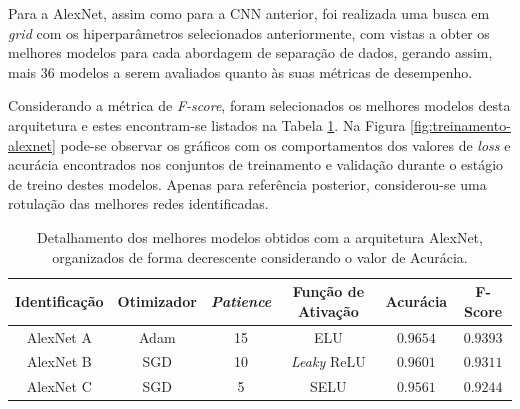 
Para a AlexNet, assim como para a CNN anterior, foi realizada uma busca em \emph{grid} com os hiperparâmetros selecionados anteriormente, com vistas a obter os melhores modelos para cada abordagem de separação de dados, gerando assim, mais $36$ modelos a serem avaliados quanto às suas métricas de desempenho.

Considerando a métrica de \emph{F-score}, foram selecionados os melhores modelos  desta arquitetura e estes encontram-se listados na Tabela \ref{tab:alexnet}. Na Figura \ref{fig:treinamento-alexnet} pode-se observar os gráficos com os comportamentos dos valores de \emph{loss} e acurácia encontrados nos conjuntos de treinamento e validação durante o estágio de treino destes modelos. Apenas para referência posterior, considerou-se uma rotulação das melhores redes identificadas.

\begin{table}[h!]
\centering
\caption{Detalhamento dos melhores modelos obtidos com a arquitetura AlexNet, organizados de forma decrescente considerando o valor de Acurácia.}
\label{tab:alexnet}
\begin{tabular}{cccccc}
\toprule
\textbf{Identificação} & \textbf{Otimizador} & \textbf{\emph{Patience}}  & \textbf{Função de Ativação} & \textbf{Acurácia} & \textbf{F-Score} \\
\midrule
AlexNet A & Adam & 15 & ELU & $0.9654$ & $0.9393$ \\
AlexNet B & SGD & 10 & \emph{Leaky} ReLU & $0.9601$ & $0.9311$ \\
AlexNet C & SGD & 5 & SELU & $0.9561$ & $0.9244$ \\
\bottomrule
\end{tabular}
\end{table}

